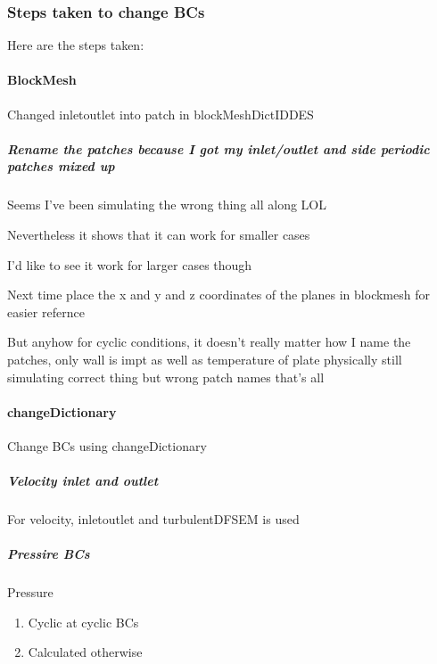 \documentclass[12pt]{article}
\renewcommand{\_}{\kern-1.5pt\textunderscore\kern-1.5pt}
\begin{document}
\subsubsection{Steps taken to change BCs}
Here are the steps taken:\par

\paragraph{BlockMesh}
 Changed inletoutlet into patch in blockMeshDictIDDES\par

\subparagraph{Rename the patches because I got my inlet/outlet and side periodic patches mixed up} \par


Seems I’ve been simulating the wrong thing all along LOL\par

 Nevertheless it shows that it can work for smaller cases\par

 I’d like to see it work for larger cases though\par

 Next time place the x and y and z coordinates of the planes in blockmesh for easier refernce\par

 But anyhow for cyclic conditions, it doesn’t really matter how I name the patches, only wall is impt as well as temperature of plate  physically still simulating correct thing but wrong patch names that’s all \par


\paragraph{changeDictionary}


Change BCs using changeDictionary\par

\subparagraph{Velocity inlet and outlet}


For velocity, inletoutlet and turbulentDFSEM is used\par

\subparagraph{Pressire BCs} \par



Pressure
\begin{enumerate}
	\item Cyclic at cyclic BCs\par

	\item Calculated otherwise\par
\end{enumerate}
\end{document}
